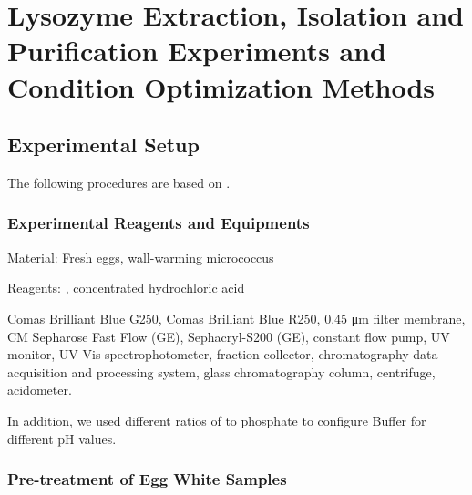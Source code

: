 % 
%
%
% 
%

\chapter{Lysozyme Extraction, Isolation and Purification Experiments and Condition Optimization Methods}

\section{Experimental Setup}
The following procedures are based on \cite{Yijun2020,Li-li2017,Yu-tong2006}.

\subsection{Experimental Reagents and Equipments}

Material: Fresh eggs, wall-warming micrococcus

Reagents: , concentrated hydrochloric acid

Comas Brilliant Blue G250, Comas Brilliant Blue R250, 0.45 μm filter membrane, CM Sepharose Fast Flow (GE), Sephacryl-S200 (GE), constant flow pump, UV monitor, UV-Vis spectrophotometer, fraction collector, chromatography data acquisition and processing system, glass chromatography column, centrifuge, acidometer.

In addition, we used different ratios of  to phosphate to configure Buffer for different pH values.

\hypertarget{pre-treatment-of-egg-white-samples}{%
\subsection{Pre-treatment of Egg White Samples}\label{pre-treatment-of-egg-white-samples}}

